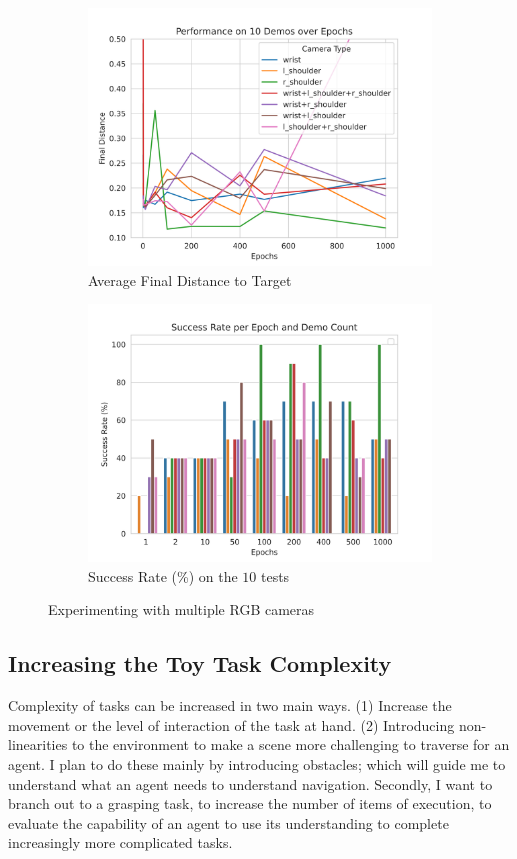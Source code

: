\begin{figure}[htpb] %
  \centering
  \begin{subfigure}{0.45\linewidth}
    \centering
    \includegraphics[width=0.7\linewidth]{assets/cam-comb/reach-no-obs/rno_random-cams.png}
    \caption{Average Final Distance to Target}\label{subfig:rno-random-cams-dist}
  \end{subfigure}
  \begin{subfigure}{0.45\linewidth}
    \centering
    \includegraphics[width=0.7\linewidth]{assets/cam-comb/reach-no-obs/rno_random-cam_success.png}
    \caption{Success Rate (\%) on the $10$ tests}\label{subfig:rno-random-cams-success}
  \end{subfigure}
  \caption{Experimenting with multiple RGB cameras}\label{fig:rno-random-cams}
\end{figure}

\subsection{Increasing the Toy Task Complexity}
Complexity of tasks can be increased in two main ways. (1) Increase the movement or the level of interaction of the task at hand. (2) Introducing non-linearities to the environment to make a scene more challenging to traverse for an agent. I plan to do these mainly by introducing obstacles; which will guide me to understand what an agent needs to understand navigation. Secondly, I want to branch out to a grasping task, to increase the number of items of execution, to evaluate the capability of an agent to use its understanding to complete increasingly more complicated tasks.

